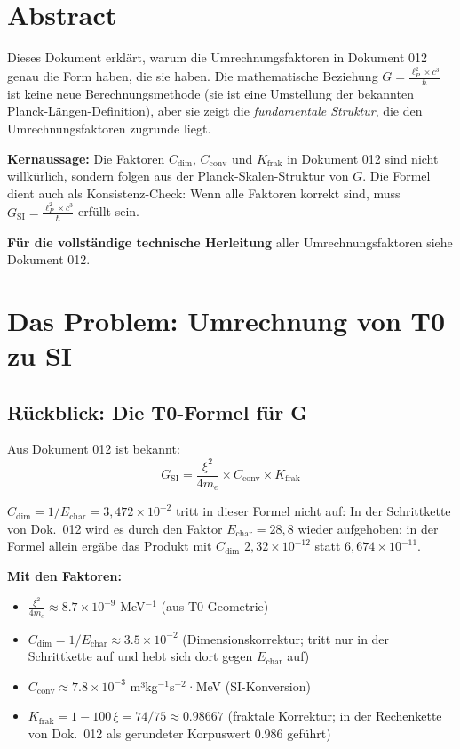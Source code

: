\section*{Abstract}
		Dieses Dokument erklärt, warum die Umrechnungsfaktoren in Dokument 012 genau die Form haben, die sie haben. Die mathematische Beziehung $G = \frac{\ell_P^2 \times c^3}{\hbar}$ ist keine neue Berechnungsmethode (sie ist eine Umstellung der bekannten Planck-Längen-Definition), aber sie zeigt die \textit{fundamentale Struktur}, die den Umrechnungsfaktoren zugrunde liegt.
		
		\textbf{Kernaussage:} Die Faktoren $C_{\text{dim}}$, $C_{\text{conv}}$ und $K_{\text{frak}}$ in Dokument 012 sind nicht willkürlich, sondern folgen aus der Planck-Skalen-Struktur von $G$. Die Formel dient auch als Konsistenz-Check: Wenn alle Faktoren korrekt sind, muss $G_{\text{SI}} = \frac{\ell_P^2 \times c^3}{\hbar}$ erfüllt sein.
		
		\textbf{Für die vollständige technische Herleitung} aller Umrechnungsfaktoren siehe Dokument 012.

	
	
	\section{Das Problem: Umrechnung von T0 zu SI}
	
	\subsection{Rückblick: Die T0-Formel für G}
	
	Aus Dokument 012 ist bekannt:
	\begin{equation}
		G_{\text{SI}} = \frac{\xi^2}{4m_e} \times C_{\text{conv}} \times K_{\text{frak}}
	\end{equation}

	$C_{\text{dim}} = 1/E_{\text{char}} = 3{,}472\times10^{-2}$ tritt in dieser Formel nicht auf: In der Schrittkette von Dok.~012 wird es durch den Faktor $E_{\text{char}} = 28{,}8$ wieder aufgehoben; in der Formel allein ergäbe das Produkt mit $C_{\text{dim}}$ $2{,}32\times10^{-12}$ statt $6{,}674\times10^{-11}$.
	
	\textbf{Mit den Faktoren:}
	\begin{itemize}
		\item $\frac{\xi^2}{4m_e} \approx 8.7 \times 10^{-9}$ MeV$^{-1}$ (aus T0-Geometrie)
		\item $C_{\text{dim}} = 1/E_{\text{char}} \approx 3.5 \times 10^{-2}$ (Dimensionskorrektur; tritt nur in der Schrittkette auf und hebt sich dort gegen $E_{\text{char}}$ auf)
		\item $C_{\text{conv}} \approx 7.8 \times 10^{-3}$ m³kg$^{-1}$s$^{-2}$·MeV (SI-Konversion)
		\item $K_{\text{frak}} = 1 - 100\,\xi = 74/75 \approx 0.98667$ (fraktale Korrektur; in der Rechenkette von Dok.~012 als gerundeter Korpuswert $0.986$ geführt)
	\end{itemize}
	

